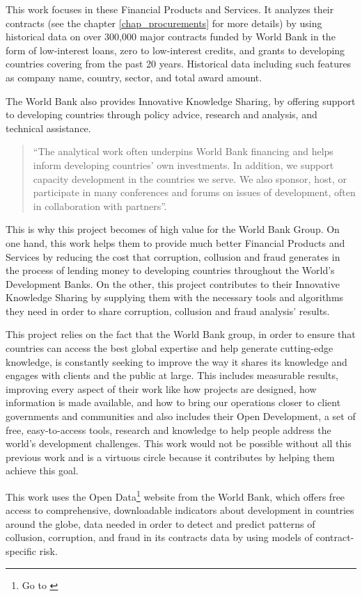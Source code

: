 This work focuses in these Financial Products and Services. It analyzes their contracts (see the chapter \ref{chap_procurements} for more details) by using historical data on over 300,000 major contracts funded by World Bank in the form of low-interest loans, zero to low-interest credits, and grants to developing countries covering  from the past 20 years. Historical data including such features as company name, country, sector, and total award amount.

The World Bank also provides Innovative Knowledge Sharing, by offering support to developing countries through policy advice, research and analysis, and technical assistance. \begin{quote}
``The analytical work often underpins World Bank financing and helps inform developing countries' own investments. In addition, we support capacity development in the countries we serve. We also sponsor, host, or participate in many conferences and forums on issues of development, often in collaboration with partners''\parencite{wb_about}.
\end{quote}

This is why this project becomes of high value for the World Bank Group. On one hand, this work helps them to provide much better Financial Products and Services by reducing the cost that corruption, collusion and fraud generates in the process of lending money to developing countries throughout the World's Development Banks. On the other, this project contributes to their Innovative Knowledge Sharing by supplying them with the necessary tools and algorithms they need in order to share corruption, collusion and fraud analysis' results.

This project relies on the fact that the World Bank group, in order to ensure that countries can access the best global expertise and help generate cutting-edge knowledge, is constantly seeking to improve the way it shares its knowledge and engages with clients and the public at large. This includes  measurable results, improving every aspect of their work like how projects are designed, how information is made available, and how to bring our operations closer to client governments and communities and also includes  their Open Development, a set of free, easy-to-access tools, research and knowledge to help people address the world's development challenges. This work would not be possible without all this previous work and is a virtuous circle because it contributes by helping them achieve this goal.

This work uses the Open Data\footnote{Go to \cite{wb_data}} website from the World Bank, which offers free access to comprehensive, downloadable indicators about development in countries around the globe, data needed in order to detect and predict patterns of collusion, corruption, and fraud in its contracts data by using models of contract-specific risk. 

